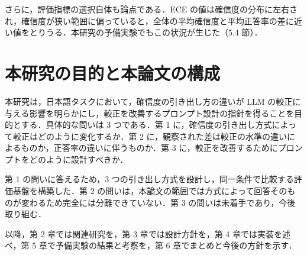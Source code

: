 さらに，評価指標の選択自体も論点である．ECE の値は確信度の分布に左右され，確信度が狭い範囲に偏っていると，全体の平均確信度と平均正答率の差に近い値をとりうる．本研究の予備実験でもこの状況が生じた（5.4 節）．

\section{本研究の目的と本論文の構成}

本研究は，日本語タスクにおいて，確信度の引き出し方の違いが LLM の較正に与える影響を明らかにし，較正を改善するプロンプト設計の指針を得ることを目的とする．具体的な問いは 3 つである．第 1 に，確信度の引き出し方式によって較正はどのように変化するか．第 2 に，観察された差は較正の水準の違いによるものか，正答率の違いに伴うものか．第 3 に，較正を改善するためにプロンプトをどのように設計すべきか．

第 1 の問いに答えるため，3 つの引き出し方式を設計し，同一条件で比較する評価基盤を構築した．第 2 の問いは，本論文の範囲では方式によって回答そのものが変わるため完全には分離できていない．第 3 の問いは未着手であり，今後取り組む．

以降，第 2 章では関連研究を，第 3 章では設計方針を，第 4 章では実装を述べ，第 5 章で予備実験の結果と考察を，第 6 章でまとめと今後の方針を示す．
